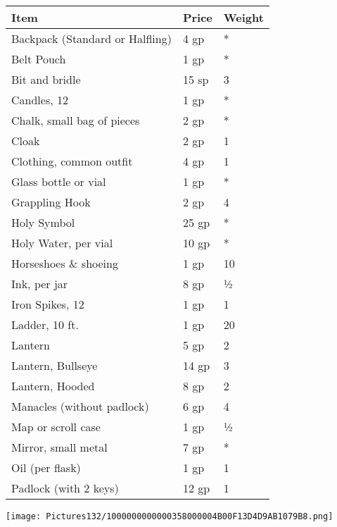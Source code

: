 \documentclass[a4paper,twoside,openany,10pt]{book}
\begin{document}
\begin{multicols}{2}
\begin{tabular*}{0.93\linewidth}{@{\extracolsep{\fill}}lll}
\textbf{Item} & \textbf{Price} & \textbf{Weight} \\\toprule
Backpack (Standard or Halfling) & 4 gp & * \\\hline
Belt Pouch & 1 gp & * \\\hline
Bit and bridle & 15 sp & 3 \\\hline
Candles, 12 & 1 gp & * \\\hline
Chalk, small bag of pieces & 2 gp & * \\\hline
Cloak & 2 gp & 1 \\\hline
Clothing, common outfit & 4 gp & 1 \\\hline
Glass bottle or vial & 1 gp & * \\\hline
Grappling Hook & 2 gp & 4 \\\hline
Holy Symbol & 25 gp & * \\\hline
Holy Water, per vial & 10 gp & * \\\hline
Horseshoes \& shoeing & 1 gp & 10 \\\hline
Ink, per jar & 8 gp & ½ \\\hline
Iron Spikes, 12 & 1 gp & 1 \\\hline
Ladder, 10 ft. & 1 gp & 20 \\\hline
Lantern & 5 gp & 2 \\\hline
Lantern, Bullseye & 14 gp & 3 \\\hline
Lantern, Hooded & 8 gp & 2 \\\hline
Manacles (without padlock) & 6 gp & 4 \\\hline
Map or scroll case & 1 gp & ½ \\\hline
Mirror, small metal & 7 gp & * \\\hline
Oil (per flask) & 1 gp & 1 \\\hline
Padlock (with 2 keys) & 12 gp & 1 \\\bottomrule
\end{tabular*}

\texttt{[image: Pictures132/1000000000000358000004B00F13D4D9AB1079B8.png]}
\vfill


\end{multicols}
\end{document}
